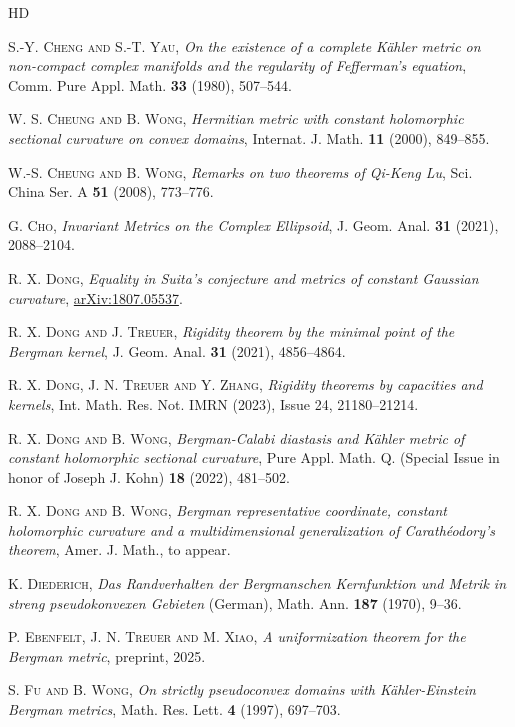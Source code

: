 \documentclass[12pt] {article}
\numberwithin{equation}{section}
\begin{document}
\begin{thebibliography}{HD}
{ \textsc{S.-Y. Cheng and S.-T. Yau}, \textit{On the existence of a complete K\"{a}hler metric on non-compact complex manifolds and the regularity of Fefferman's equation}, Comm. Pure Appl. Math. {\bf 33} (1980), 507--544.

 \textsc{W. S. Cheung and B. Wong}, \emph{Hermitian metric with constant holomorphic sectional curvature on convex domains}, Internat. J. Math. {\bf 11} (2000), 849--855.

 \textsc{W.-S. Cheung and B. Wong}, \emph{Remarks on two theorems of Qi-Keng Lu}, Sci. China Ser. A {\bf 51} (2008), 773--776.

 \textsc{G. Cho}, \emph{Invariant Metrics on the Complex Ellipsoid}, J. Geom. Anal. {\bf 31} (2021), 2088--2104.

 \textsc{R. X. Dong}, \emph{Equality in Suita's conjecture and metrics of constant Gaussian curvature}, \href{https://arxiv.org/abs/1807.05537}{{\color{black} {arXiv:1807.05537}}}.

 \textsc{R. X. Dong and J. Treuer}, \emph{Rigidity theorem by the minimal point of the Bergman kernel}, J. Geom. Anal. {\bf 31} (2021), 4856--4864.

 \textsc{R. X. Dong, J. N. Treuer and Y. Zhang}, \emph{Rigidity theorems by capacities and kernels}, Int. Math. Res. Not. IMRN (2023), Issue 24, 21180--21214.

 \textsc{R. X. Dong and B. Wong}, \emph{Bergman-Calabi diastasis and K\"ahler metric of constant holomorphic sectional curvature}, Pure Appl. Math. Q. (Special Issue in honor of Joseph J. Kohn) {\bf 18} (2022), 481--502.

 \textsc{R. X. Dong and B. Wong}, \emph{Bergman representative coordinate, constant holomorphic curvature and a multidimensional generalization of Carath\'eodory's theorem}, Amer. J. Math., to appear.


 \textsc{K. Diederich}, \emph{Das Randverhalten der Bergmanschen Kernfunktion und Metrik in streng pseudokonvexen Gebieten} (German), Math. Ann. {\bf 187} (1970), 9--36.



 \textsc{P. Ebenfelt, J. N. Treuer and M. Xiao}, \emph{A uniformization theorem for the Bergman metric}, preprint, 2025.


 \textsc{S. Fu and B. Wong}, \emph{On strictly pseudoconvex domains with K\"{a}hler-Einstein Bergman metrics}, Math. Res. Lett. {\bf 4} (1997), 697--703.

}
\end{thebibliography}
\end{document}
